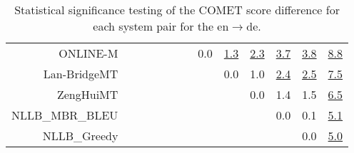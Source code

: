 \documentclass[11pt]{article}
\begin{document}
\begin{sidewaystable}
\begin{center}
{\begin{tabular}{rcccccccccccc}
ONLINE-M &  &  &  &  &  &  & \cellcolor{red!0} 0.0 & \cellcolor{red!70} \underline{1.3} & \cellcolor{red!70} \underline{2.3} & \cellcolor{red!70} \underline{3.7} & \cellcolor{red!70} \underline{3.8} & \cellcolor{red!70} \underline{8.8}\\ 
Lan-BridgeMT &  &  &  &  &  &  &  & \cellcolor{red!0} 0.0 & \cellcolor{red!60} 1.0 & \cellcolor{red!70} \underline{2.4} & \cellcolor{red!70} \underline{2.5} & \cellcolor{red!70} \underline{7.5}\\ 
ZengHuiMT &  &  &  &  &  &  &  &  & \cellcolor{red!0} 0.0 & \cellcolor{red!70} 1.4 & \cellcolor{red!60} 1.5 & \cellcolor{red!70} \underline{6.5}\\ 
NLLB\_MBR\_BLEU &  &  &  &  &  &  &  &  &  & \cellcolor{red!0} 0.0 & \cellcolor{red!0} 0.1 & \cellcolor{red!70} \underline{5.1}\\ 
NLLB\_Greedy &  &  &  &  &  &  &  &  &  &  & \cellcolor{red!0} 0.0 & \cellcolor{red!70} \underline{5.0}\\ 
\bottomrule 
\end{tabular} }
\caption{Statistical significance testing of the COMET score difference for each system pair for the en$\rightarrow$de.} 
 \end{center} \end{sidewaystable} 
\end{document}
